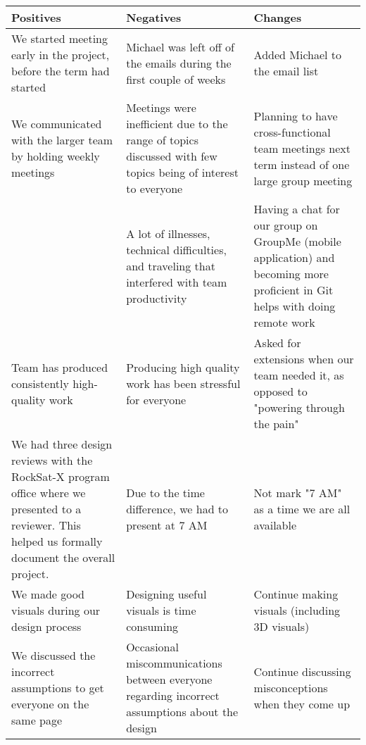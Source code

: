 \begin{center}
\begin{tabulary}
{ \textwidth }
{ J | J | J }
\textbf{Positives} & \textbf{Negatives} & \textbf{Changes} \\ \hline

We started meeting early in the project, before the term had started & Michael was left off of the emails
during the first couple of weeks & Added Michael to the email list \\ \hline

We communicated with the larger team by holding weekly meetings & Meetings were inefficient due to the range of topics
discussed with few topics being of interest to everyone & Planning to have cross-functional team meetings
next term instead of one large group meeting \\ \hline

 & A lot of illnesses, technical difficulties, and traveling that interfered with team productivity 
& Having a chat for our group on GroupMe (mobile application) and
becoming more proficient in Git helps with doing remote work \\ \hline

Team has produced consistently high-quality work & Producing high quality work has been stressful for everyone
& Asked for extensions when our team needed it, as opposed to "powering through the pain" \\ \hline

We had three design reviews with the RockSat-X program office where we presented to a reviewer. This helped
us formally document the overall project. & Due to the time difference, we had to present at 7 AM
& Not mark "7 AM" as a time we are all available \\ \hline

We made good visuals during our design process & Designing useful visuals is time consuming
& Continue making visuals (including 3D visuals) \\ \hline

We discussed the incorrect assumptions to get everyone on the same page 
& Occasional miscommunications between everyone regarding incorrect assumptions about the design
& Continue discussing misconceptions when they come up \\ \hline


\end{tabulary}
\end{center}
